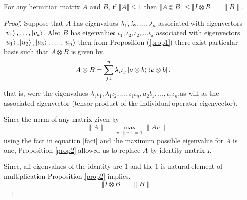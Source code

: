 \begin{lemma}
\label{lem:tensor-norm}
For any hermitian matrix $A$ and $B$, if $\Vert A\Vert \leqslant 1$ then $\Vert A\otimes B \Vert \leqslant \Vert I\otimes B \Vert=\|B\|$.
\end{lemma}

\begin{proof}
Suppose that $A$ has eigenvalues $\lambda_1,\lambda_2,\dots ,\lambda_n$  associated with eigenvectors $\ket{v_1},\dots,\ket{v_n}$.
Also $B$ has eigenvalues $\iota_1,\iota_2,\iota_2,\dots \iota_n$ associated with eigenvectors $\ket{u_1},\ket{u_2},\ket{u_3}, \dots ,\ket{u_n}$ then from Proposition (\ref{prop1}) there exist particular basis such that  $A\otimes B$ is given by.
\begin{align}
 A\otimes B&=\sum_{j,i}^n  \lambda_i \iota_j \ket{a\otimes b}\bra{a \otimes b}.
\end{align}

that is, were the eigenvalues $\lambda_1 \iota_1,\lambda_1 \iota_2,\ldots,\iota_1 \iota_n,a_2b_1,\dots ,\iota_n \iota_n$,as will as  the associated  eigenvector  (tensor product of the individual operator eigenvector).

Since the norm of any matrix given by
\begin{equation}
\| A \|=\max_{v: \| v\|=1}\| A v\|\label{fact}
\end{equation}
using the fact in equation \ref {fact} and the maximum possible eigenvalue for $A$ is one, Proposition \ref{prop2} allowed us to replace $A$ by identity matrix $I$.

Since, all  eigenvalues of the identity are $1$ and the $1$ is natural element of multiplication Proposition \ref{prop2} implies.
\begin{equation}
\Vert I\otimes B \Vert=\|B\|
\end{equation}
\end{proof}


